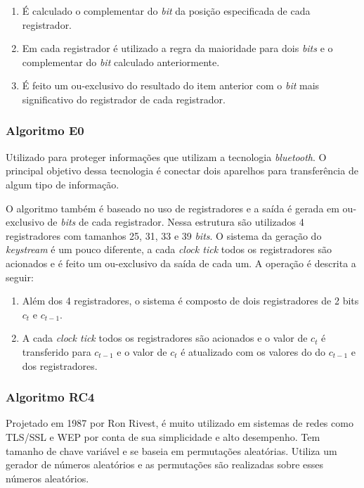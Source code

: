 \begin{enumerate}
	\item É calculado o complementar do \textit{bit} da posição especificada de cada registrador.
	\item Em cada registrador é utilizado a regra da maioridade para dois \textit{bits} e o complementar do \textit{bit} calculado anteriormente. 
	\item É feito um ou-exclusivo do resultado do item anterior com o \textit{bit} mais significativo do registrador de cada registrador.
\end{enumerate}


\subsubsection{Algoritmo E0}
\label{algorithm-e0}

Utilizado para proteger informações que utilizam a tecnologia \textit{bluetooth}. O principal objetivo dessa tecnologia é conectar dois aparelhos para transferência de algum tipo de informação.

O algoritmo também é baseado no uso de registradores e a saída é gerada em ou-exclusivo de \textit{bits} de cada registrador. Nessa estrutura são utilizados 4 registradores com tamanhos 25, 31, 33 e 39 \textit{bits}. O sistema da geração do \textit{keystream} é um pouco diferente, a cada \textit{clock tick} todos os registradores são acionados e é feito um ou-exclusivo da saída de cada um. A operação é descrita a seguir:

\begin{enumerate}
	\item Além dos 4 registradores, o sistema é composto de dois registradores de 2 bits $c_t$ e $c_{t-1}$.
	\item A cada \textit{clock tick} todos os registradores são acionados e o valor de $ c_t $ é transferido para $ c_{t-1}$ e o valor de $ c_t$ é atualizado com os valores do do $ c_{t-1}$ e dos registradores.
\end{enumerate}

\subsubsection{Algoritmo RC4}
\label{algorithm-rc4}

Projetado em 1987 por Ron Rivest, é muito utilizado em sistemas de redes como TLS/SSL e WEP por conta de sua simplicidade e alto desempenho. Tem tamanho de chave variável e se baseia em permutações aleatórias. Utiliza um gerador de números aleatórios e as permutações são realizadas sobre esses números aleatórios.

